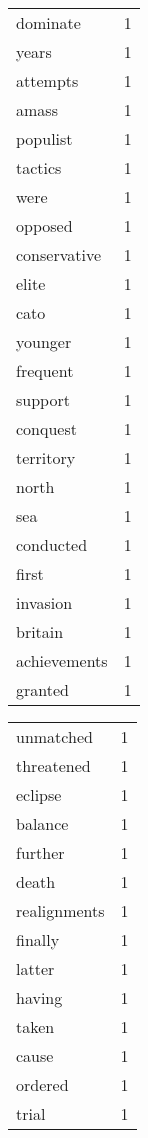 \begin{center}
\begin{scriptsize}
\begin{tabular}{|ll|}
dominate      & 1\\%
years         & 1\\%
attempts      & 1\\%
amass         & 1\\%
populist      & 1\\%
tactics       & 1\\%
were          & 1\\%
opposed       & 1\\%
conservative  & 1\\%
elite         & 1\\%
cato          & 1\\%
younger       & 1\\%
frequent      & 1\\%
support       & 1\\%
conquest      & 1\\%
territory     & 1\\%
north         & 1\\%
sea           & 1\\%
conducted     & 1\\%
first         & 1\\%
invasion      & 1\\%
britain       & 1\\%
achievements  & 1\\%
granted       & 1\\%
\hline
\end{tabular}
\begin{tabular}{|ll|}
\hline
unmatched     & 1\\%
threatened    & 1\\%
eclipse       & 1\\%
balance       & 1\\%
further       & 1\\%
death         & 1\\%
realignments  & 1\\%
finally       & 1\\%
latter        & 1\\%
having        & 1\\%
taken         & 1\\%
cause         & 1\\%
ordered       & 1\\%
trial         & 1\\%

\end{tabular}
\end{scriptsize}
\end{center}
